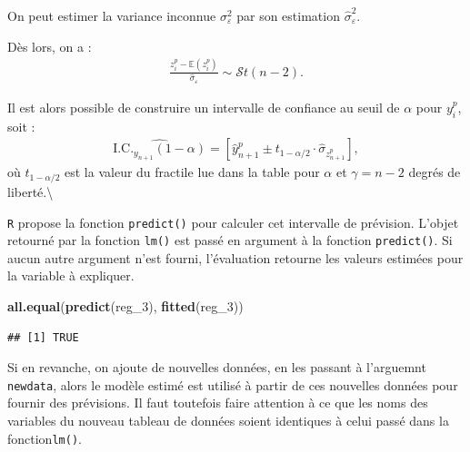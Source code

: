 \documentclass[
  11pt,
]{book}
\newenvironment{Shaded}{\begin{snugshade}}{\end{snugshade}}
\newcommand{\DecValTok}[1]{\textcolor[rgb]{0.00,0.00,0.81}{#1}}
\newcommand{\KeywordTok}[1]{\textcolor[rgb]{0.13,0.29,0.53}{\textbf{#1}}}
\newcommand{\NormalTok}[1]{#1}
\numberwithin{equation}{section}
\numberwithin{countremarque}{section}
\begin{document}
On peut estimer la variance inconnue \(\sigma^2_\varepsilon\) par son estimation \(\hat{\sigma}^2_\varepsilon\).

Dès lors, on a :
\begin{align}
\frac{z_i^p - \mathbb{E}(z_i^p)}{\hat{\sigma}_{\varepsilon}} \sim \mathcal{S}t(n-2).
\end{align}

Il est alors possible de construire un intervalle de confiance au seuil de \(\alpha\) pour \(y_i^p\), soit :
\begin{align}
\widehat{\textrm{I.C.}_{y_{n+1}}(1-\alpha)} = \left[ \hat{y}_{n+1}^p \pm t_{1-\alpha/2} \cdot \hat{\sigma}_{z_{n+1}^p} \right],
\end{align}
où \(t_{1-\alpha/2}\) est la valeur du fractile lue dans la table pour \(\alpha\) et \(\gamma = n-2\) degrés de liberté.\textbackslash{}

\texttt{R} propose la fonction \texttt{predict()} pour calculer cet intervalle de prévision. L'objet retourné par la fonction \texttt{lm()} est passé en argument à la fonction \texttt{predict()}. Si aucun autre argument n'est fourni, l'évaluation retourne les valeurs estimées pour la variable à expliquer.

\begin{Shaded}
\begin{Highlighting}[]
\KeywordTok{all.equal}\NormalTok{(}\KeywordTok{predict}\NormalTok{(reg\_}\DecValTok{3}\NormalTok{), }\KeywordTok{fitted}\NormalTok{(reg\_}\DecValTok{3}\NormalTok{))}
\end{Highlighting}
\end{Shaded}

\begin{lstlisting}
## [1] TRUE
\end{lstlisting}

Si en revanche, on ajoute de nouvelles données, en les passant à l'arguemnt \texttt{newdata}, alors le modèle estimé est utilisé à partir de ces nouvelles données pour fournir des prévisions. Il faut toutefois faire attention à ce que les noms des variables du nouveau tableau de données soient identiques à celui passé dans la fonction\texttt{lm()}.
\end{document}
